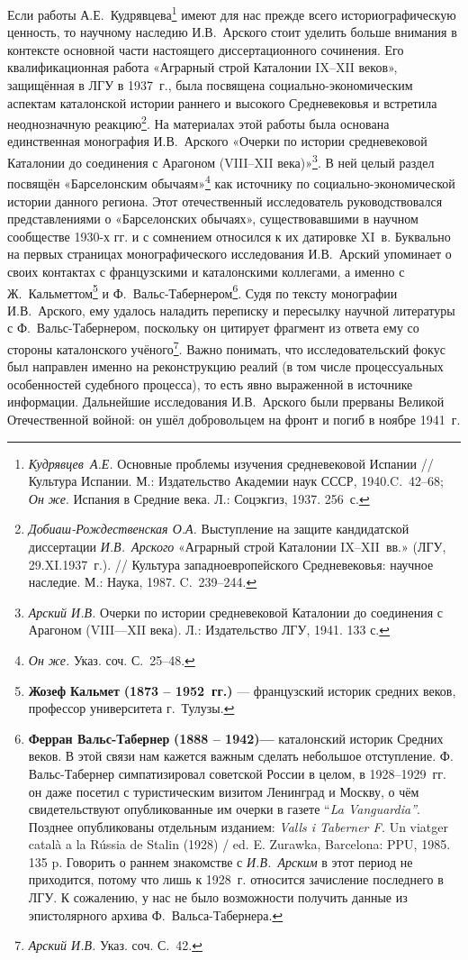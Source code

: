Если работы А.Е.~Кудрявцева\footnote{\emph{Кудрявцев~А.Е.} Основные проблемы изучения средневековой Испании // Культура Испании. М.: Издательство Академии наук СССР, 1940.C.~42--68; \emph{Он же}. Испания в Средние века. Л.: Соцэкгиз, 1937. 256~с.} имеют для нас прежде всего историографическую ценность, то научному наследию И.В.~Арского стоит уделить больше внимания в контексте основной части настоящего диссертационного сочинения. Его квалификационная работа «Аграрный строй Каталонии IX--XII веков», защищённая в ЛГУ в 1937~г., была посвящена социально-экономическим аспектам каталонской истории раннего и высокого Средневековья и встретила неоднозначную реакцию\footnote{\emph{Добиаш}\emph{-Рождественская О.А.} Выступление на защите кандидатской диссертации \emph{И.В.~Арского} «Аграрный строй Каталонии IX--XII~вв.» (ЛГУ, 29.XI.1937~г.). // Культура западноевропейского Средневековья: научное наследие. М.: Наука, 1987. C.~239--244.}. На материалах этой работы была основана единственная монография И.В.~Арского «Очерки по истории средневековой Каталонии до соединения с Арагоном (VIII--XII века)»\footnote{\emph{Арский И.В.} Очерки по истории средневековой Каталонии до соединения с Арагоном (VIII---XII века). Л.: Издательство ЛГУ, 1941. 133 с.}. В ней целый раздел посвящён «Барселонским обычаям»\footnote{\emph{Он же. }Указ. соч. С.~25--48.} как источнику по социально-экономической истории данного региона. Этот отечественный исследователь руководствовался представлениями о «Барселонских обычаях», существовавшими в научном сообществе 1930-х гг. и с сомнением относился к их датировке XI~в. Буквально на первых страницах монографического исследования И.В.~Арский упоминает о своих контактах с французскими и каталонскими коллегами, а именно с Ж.~Кальметтом\footnote{\textbf{Жозеф }\textbf{Кальмет}\textbf{ (1873 -- 1952~гг.)} --- французский историк средних веков, профессор университета г.~Тулузы.} и Ф.~Вальс-Табернером\footnote{\textbf{Ферран Вальс-}\textbf{Табернер}\textbf{ (1888 -- 1942)---} каталонский историк Средних веков. В этой связи нам кажется важным сделать небольшое отступление. Ф. Вальс-Табернер симпатизировал советской России в целом, в 1928--1929~гг. он даже посетил с туристическим визитом Ленинград и Москву, о чём свидетельствуют опубликованные им очерки в газете “\emph{La Vanguardia}\emph{”}. Позднее опубликованы отдельным изданием: \emph{Valls i Taberner F.} Un viatger català a la Rússia de Stalin (1928) / ed. E. Zurawka, Barcelona: PPU, 1985. 135 p. Говорить о раннем знакомстве с \emph{И.В.~Арским} в этот период не приходится, потому что лишь к 1928~г. относится зачисление последнего в ЛГУ. К сожалению, у нас не было возможности получить данные из эпистолярного архива Ф.~Вальса-Табернера.}. Судя по тексту монографии И.В.~Арского, ему удалось наладить переписку и пересылку научной литературы с Ф.~Вальс-Табернером, поскольку он цитирует фрагмент из ответа ему со стороны каталонского учёного\footnote{\emph{Арский И.В.} Указ. соч. С.~42.}. Важно понимать, что исследовательский фокус был направлен именно на реконструкцию реалий (в том числе процессуальных особенностей судебного процесса), то есть явно выраженной в источнике информации. Дальнейшие исследования И.В.~Арского были прерваны Великой Отечественной войной: он ушёл добровольцем на фронт и погиб в ноябре 1941~г.

